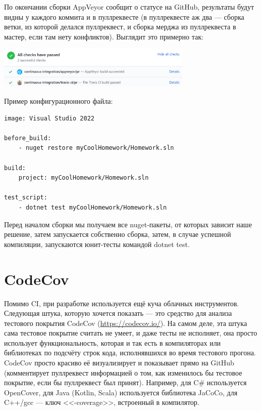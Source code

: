 \documentclass[a5paper]{article}
\begin{document}
По окончании сборки AppVeyor сообщит о статусе на GitHub, результаты будут видны у каждого коммита и в пуллреквесте (в пуллреквесте аж два --- сборка ветки, из которой делался пуллреквест, и сборка мерджа из пуллреквеста в мастер, если там нету конфликтов). Выглядит это примерно так:

\begin{center}
    \includegraphics[width=0.7\textwidth]{appVeyorSuccess.png}
\end{center}

Пример конфигурационного файла:

\begin{verbatim}
image: Visual Studio 2022

before_build: 
    - nuget restore myCoolHomework/Homework.sln

build: 
    project: myCoolHomework/Homework.sln

test_script: 
    - dotnet test myCoolHomework/Homework.sln
\end{verbatim}

Перед началом сборки мы получаем все nuget-пакеты, от которых зависит наше решение, затем запускается собственно сборка, затем, в случае успешной компиляции, запускаются юнит-тесты командой dotnet test.

\section{CodeCov}

Помимо CI, при разработке используется ещё куча облачных инструментов. Следующая штука, которую хочется показать --- это средство для анализа тестового покрытия CodeCov (\url{https://codecov.io/}). На самом деле, эта штука сама тестовое покрытие считать не умеет, и даже тесты не исполняет, она просто использует функциональность, которая и так есть в компиляторах или библиотеках по подсчёту строк кода, исполнявшихся во время тестового прогона. CodeCov просто красиво её визуализирует и показывает прямо на GitHub (комментирует пуллреквест информацией о том, как изменилось бы тестовое покрытие, если бы пуллреквест был принят). Например, для C\# используется OpenCover, для Java (Kotlin, Scala) используется библиотека JaCoCo, для C++/gcc --- ключ <<-coverage>>, встроенный в компилятор.
\end{document}
